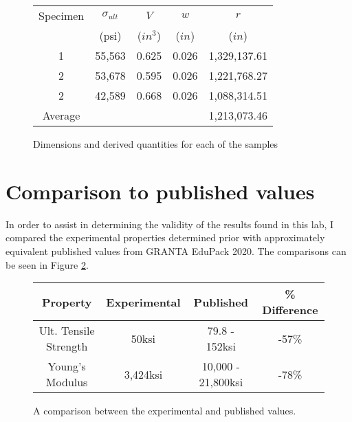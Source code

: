 \documentclass{article}
\begin{document}
\begin{figure}[H]
\begin{center}
  \begin{tabular}{|c|c|c|c|c|}
      \hline
      Specimen & $\sigma_{ult}$ & $V$ & $w$ & $r$ \\
               & (psi) & ($in^3$) & ($in$) & ($in$) \\
      \hline
      1 & 55,563 & 0.625 & 0.026 &  1,329,137.61 \\
      2 & 53,678 & 0.595 & 0.026 &  1,221,768.27 \\
      2 & 42,589 & 0.668 & 0.026 &  1,088,314.51 \\
      \hline
      Average &&&&  1,213,073.46 \\
      \hline
  \end{tabular}
  \caption{Dimensions and derived quantities for each of the samples}
  \label{tab:SpecimenDimensions}
\end{center}
\end{figure}

\section{Comparison to published values}
In order to assist in determining the validity of the results found in this lab, I compared the experimental properties determined prior with approximately equivalent published values from GRANTA EduPack 2020. The comparisons can be seen in Figure \ref{tab:PropertyComparison}.


\begin{figure}[H]
\begin{center}
  \begin{tabular}{|c|c|c|c|}
      \hline
      Property & Experimental & Published & \% Difference \\
      \hline
      Ult. Tensile Strength & 50ksi & 79.8 - 152ksi & -57\% \\
      Young's Modulus & 3,424ksi & 10,000 - 21,800ksi & -78\% \\
      \hline
  \end{tabular}
  \caption{A comparison between the experimental and published values.}
  \label{tab:PropertyComparison}
\end{center}
\end{figure}
\end{document}

